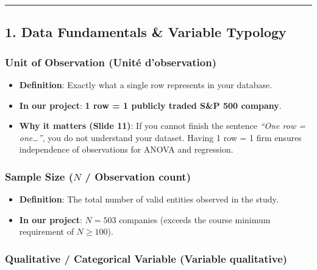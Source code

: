 \documentclass[
]{article}
\providecommand{\tightlist}{%
  \setlength{\itemsep}{0pt}\setlength{\parskip}{0pt}}
\begin{document}
\begin{center}\rule{0.5\linewidth}{0.5pt}\end{center}

\subsection{1. Data Fundamentals \& Variable
Typology}\label{data-fundamentals-variable-typology}

\subsubsection{Unit of Observation (Unité
d'observation)}\label{unit-of-observation-unituxe9-dobservation}

\begin{itemize}
\tightlist
\item
  \textbf{Definition}: Exactly what a single row represents in your
  database.
\item
  \textbf{In our project}: \textbf{1 row = 1 publicly traded S\&P 500
  company}.
\item
  \textbf{Why it matters (Slide 11)}: If you cannot finish the sentence
  \emph{``One row = one\ldots{}''}, you do not understand your dataset.
  Having 1 row = 1 firm ensures independence of observations for ANOVA
  and regression.
\end{itemize}

\subsubsection{\texorpdfstring{Sample Size (\(N\) / Observation
count)}{Sample Size (N / Observation count)}}\label{sample-size-n-observation-count}

\begin{itemize}
\tightlist
\item
  \textbf{Definition}: The total number of valid entities observed in
  the study.
\item
  \textbf{In our project}: \(N = 503\) companies (exceeds the course
  minimum requirement of \(N \ge 100\)).
\end{itemize}

\subsubsection{Qualitative / Categorical Variable (Variable
qualitative)}\label{qualitative-categorical-variable-variable-qualitative}
\end{document}
